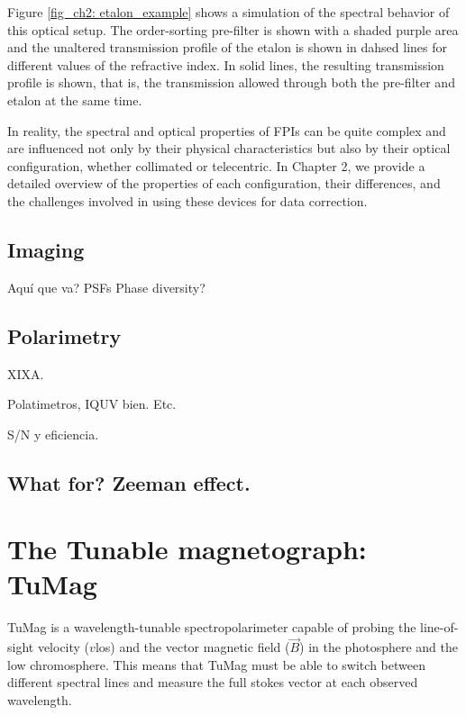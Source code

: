 Figure \ref{fig_ch2: etalon_example} shows a simulation of the spectral behavior of this optical setup. The order-sorting pre-filter is shown with a shaded purple area and the unaltered transmission profile of the etalon is shown in dahsed lines for different values of the refractive index. In solid lines, the resulting transmission profile is shown, that is, the transmission allowed through both the pre-filter and etalon at the same time. 

In reality, the spectral and optical properties of FPIs can be quite complex and are influenced not only by their physical characteristics but also by their optical configuration, whether collimated or telecentric. In Chapter 2, we provide a detailed overview of the properties of each configuration, their differences, and the challenges involved in using these devices for data correction.

\subsection{\label{susec_spectropolarimeters: Imaging}Imaging}

Aquí que va? PSFs Phase diversity? 


\subsection{Polarimetry}


XIXA. 

Polatimetros, IQUV bien. Etc. 

S/N y eficiencia. 

\subsection{What for? Zeeman effect.}





\section{The Tunable magnetograph: TuMag}

TuMag is a wavelength-tunable spectropolarimeter capable of probing the line-of-sight velocity ($v$los) and the vector magnetic field ($\vec{B}$) in the photosphere and the low chromosphere. This means that TuMag must be able to switch between different spectral lines and measure the full stokes vector at each observed wavelength. 

